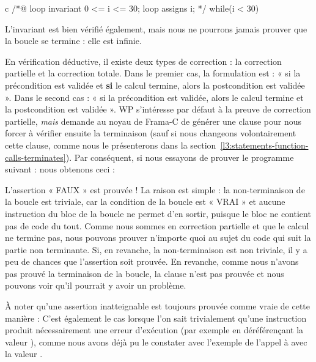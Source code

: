 \begin{CodeBlock}{c}
/*@
  loop invariant 0 <= i <= 30;
  loop assigns i;
*/
while(i < 30){

}
\end{CodeBlock}



L'invariant est bien vérifié également, mais nous ne pourrons jamais prouver
que la boucle se termine : elle est infinie.



\label{l3:statements-loops-variant}


En vérification déductive, il existe deux types de correction : la correction
partielle et la correction totale. Dans le premier cas, la formulation est :
« si la précondition est validée et \textbf{si} le calcul termine, alors la
postcondition est validée ». Dans le second cas : « si la précondition est
validée, alors le calcul termine et la postcondition est validée ». WP
s'intéresse par défaut à la preuve de correction partielle, \textit{mais}
demande au noyau de Frama-C de générer une clause  pour
nous forcer à vérifier ensuite la terminaison (sauf si nous changeons
volontairement cette clause, comme nous le présenterons dans la
section~\ref{l3:statements-function-calls-terminates}). Par conséquent, si nous
essayons de prouver le programme suivant :
nous obtenons ceci :


L'assertion « FAUX » est prouvée ! La raison est simple : la non-terminaison de
la boucle est triviale, car la condition de la boucle est « VRAI » et aucune instruction
du bloc de la boucle ne permet d'en sortir, puisque le bloc ne contient pas de code du
tout. Comme nous sommes en correction partielle et que le calcul ne termine pas, nous
pouvons prouver n'importe quoi au sujet du code qui suit la partie non terminante. Si,
en revanche, la non-terminaison est non triviale, il y a peu de chances que l'assertion
soit prouvée. En revanche, comme nous n'avons pas prouvé la terminaison de la
boucle, la clause  n'est pas prouvée et nous pouvons voir
qu'il pourrait y avoir un problème.



\begin{Information}
  À noter qu'une assertion inatteignable est toujours prouvée comme vraie de
  cette manière :
  C'est également le cas lorsque l'on sait trivialement qu'une instruction
  produit nécessairement une erreur d'exécution (par exemple en déréférençant
  la valeur ), comme nous avons déjà pu le constater avec
  l'exemple de l'appel à  avec la valeur .
\end{Information}


